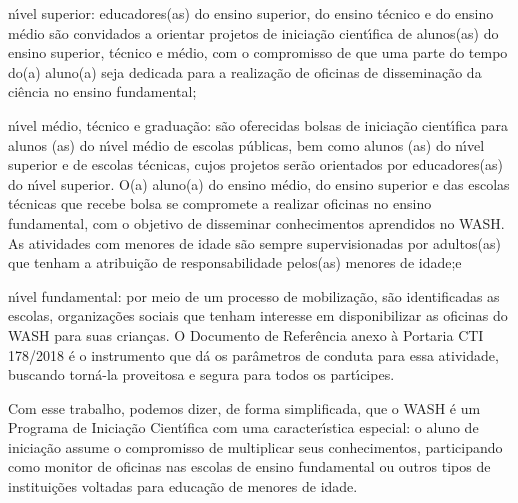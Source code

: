 \documentclass[
12pt,		%
openright,	%
twoside,  %
a4paper,			%
chapter=TITLE,		%
english,			%
french,				%
spanish,			%
brazil				%
]{USPSC-classe/USPSC}
\begin{document}
\begin{alineas}
\item n\'{\i}vel superior: educadores(as) do ensino superior, do ensino t\'ecnico e do ensino m\'edio s\~ao convidados a orientar projetos de inicia\c{c}\~ao cient\'{\i}fica de alunos(as) do ensino superior, t\'ecnico e m\'edio, com o compromisso de que uma parte do tempo do(a) aluno(a) seja dedicada para a realiza\c{c}\~ao de oficinas de dissemina\c{c}\~ao da ci\^encia no ensino fundamental;
\item n\'{\i}vel m\'edio, t\'ecnico e gradua\c{c}\~ao: s\~ao oferecidas bolsas de inicia\c{c}\~ao cient\'{\i}fica para alunos (as) do n\'{\i}vel m\'edio de escolas p\'ublicas, bem como alunos (as) do n\'{\i}vel superior e de escolas t\'ecnicas, cujos projetos ser\~ao orientados por educadores(as) do n\'{\i}vel superior. O(a) aluno(a) do ensino m\'edio, do ensino superior e das escolas t\'ecnicas que recebe bolsa se compromete a realizar oficinas no ensino fundamental, com o objetivo de disseminar conhecimentos aprendidos no WASH. As atividades com menores de idade s\~ao sempre supervisionadas por adultos(as) que tenham a  atribui\c{c}\~ao de responsabilidade pelos(as) menores de idade;e
\item n\'{\i}vel fundamental: por meio de um processo de mobiliza\c{c}\~ao, s\~ao identificadas as escolas, organiza\c{c}\~oes sociais que tenham interesse em disponibilizar as oficinas do WASH para suas crian\c{c}as. O Documento de Refer\^encia anexo \`a Portaria CTI 178/2018 \'e o instrumento que d\'a os par\^ametros de conduta para essa atividade, buscando torn\'a-la proveitosa e segura para todos os part\'{\i}cipes.

\end{alineas}

Com esse trabalho, podemos dizer, de forma simplificada, que o WASH \'e um Programa de Inicia\c{c}\~ao Cient\'{\i}fica com uma caracter\'{\i}stica especial: o aluno de inicia\c{c}\~ao assume o compromisso de multiplicar seus conhecimentos, participando como monitor de oficinas nas escolas de ensino fundamental ou outros tipos de institui\c{c}\~oes voltadas para educa\c{c}\~ao de menores de idade.
\end{document}
